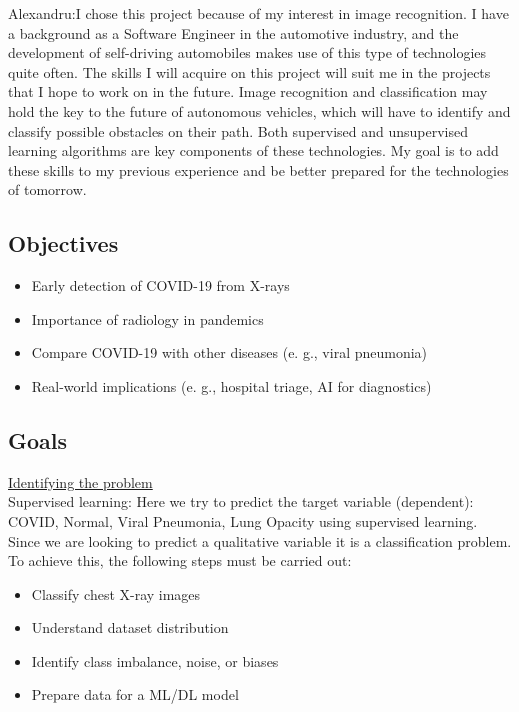 \documentclass{article}
\begin{document}
\vspace{0.3cm}

Alexandru:I chose this project because of my interest in image recognition. I have a background as a Software Engineer in the automotive industry, and the development of self-driving automobiles makes use of this type of technologies quite often. The skills I will acquire on this project will suit me in the projects that I hope to work on in the future. Image recognition and classification may hold the key to the future of autonomous vehicles, which will have to identify and classify possible obstacles on their path. Both supervised and unsupervised learning algorithms are key components of these technologies.
My goal is to add these skills to my previous experience and be better prepared for the technologies of tomorrow. 
\newpage
\subsection{Objectives}
\vspace{0.3cm}
\begin{itemize}
    \item Early detection of COVID-19 from X-rays 
    \item Importance of radiology in pandemics
    \item Compare COVID-19 with other diseases (e. g., viral pneumonia)
    \item Real-world implications (e. g., hospital triage, AI for diagnostics)
\end{itemize}

\vspace{0.5cm}
\subsection{Goals}
\vspace{0.3cm}
\underline{Identifying the problem}\\

Supervised learning: Here we try to predict the target variable (dependent): COVID, Normal, Viral Pneumonia, Lung Opacity using supervised learning. Since we are looking to predict a qualitative variable it is a classification problem. To achieve this, the following steps must be carried out:
\begin{itemize}
    \item Classify chest X-ray images
    \item Understand dataset distribution
    \item Identify class imbalance, noise, or biases
    \item Prepare data for a ML/DL model
\end{itemize}
\end{document}
